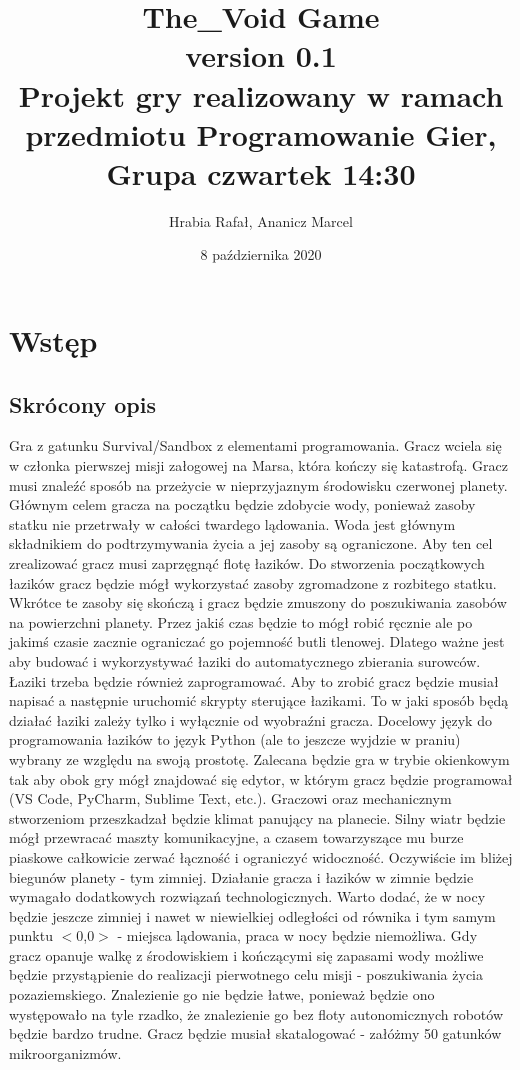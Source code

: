 \documentclass[a4paper,12pt]{article}
\author{Hrabia Rafał, Ananicz Marcel}
\title{
The\_Void Game \\
\vspace{0.2em}
\small version 0.1 \\
\vspace{1em}
\small Projekt gry realizowany w ramach przedmiotu Programowanie Gier,\\
Grupa czwartek 14:30
}
\date{8 października 2020}
\begin{document}
\maketitle

\pagebreak

\tableofcontents

\pagebreak

\section{Wstęp}
\subsection{Skrócony opis}

Gra z gatunku Survival/Sandbox z elementami programowania. Gracz wciela się w członka pierwszej misji załogowej na Marsa, która kończy się katastrofą. Gracz musi znaleźć sposób na przeżycie w nieprzyjaznym środowisku czerwonej planety. Głównym celem gracza na początku będzie zdobycie wody, ponieważ zasoby statku nie przetrwały w całości twardego lądowania. Woda jest głównym składnikiem do podtrzymywania życia a jej zasoby są ograniczone. Aby ten cel zrealizować gracz musi zaprzęgnąć flotę łazików. Do stworzenia początkowych łazików gracz będzie mógł wykorzystać zasoby zgromadzone z rozbitego statku. Wkrótce te zasoby się skończą i gracz będzie zmuszony do poszukiwania zasobów na powierzchni planety. Przez jakiś czas będzie to mógł robić ręcznie ale po jakimś czasie zacznie ograniczać go pojemność butli tlenowej. Dlatego ważne jest aby budować i wykorzystywać łaziki do automatycznego zbierania surowców. Łaziki trzeba będzie również zaprogramować. Aby to zrobić gracz będzie musiał napisać a następnie uruchomić skrypty sterujące łazikami. To w jaki sposób będą działać łaziki zależy tylko i wyłącznie od wyobraźni gracza. Docelowy język do programowania łazików to język Python (ale to jeszcze wyjdzie w praniu) wybrany ze względu na swoją prostotę. Zalecana będzie gra w trybie okienkowym tak aby obok gry mógł znajdować się edytor, w którym gracz będzie programował (VS Code, PyCharm, Sublime Text, etc.). Graczowi oraz mechanicznym stworzeniom przeszkadzał będzie klimat panujący na planecie. Silny wiatr będzie mógł przewracać maszty komunikacyjne, a czasem towarzyszące mu burze piaskowe całkowicie zerwać łączność i ograniczyć widoczność. Oczywiście im bliżej biegunów planety - tym zimniej. Działanie gracza i łazików w zimnie będzie wymagało dodatkowych rozwiązań technologicznych. Warto dodać, że w nocy będzie jeszcze zimniej i nawet w niewielkiej odległości od równika i tym samym punktu $<$0,0$>$ - miejsca lądowania, praca w nocy będzie niemożliwa. Gdy gracz opanuje walkę z środowiskiem i kończącymi się zapasami wody możliwe będzie przystąpienie do realizacji pierwotnego celu misji - poszukiwania życia pozaziemskiego. Znalezienie go nie będzie łatwe, ponieważ będzie ono występowało na tyle rzadko, że znalezienie go bez floty autonomicznych robotów będzie bardzo trudne. Gracz będzie musiał skatalogować - załóżmy 50 gatunków mikroorganizmów.
\end{document}
